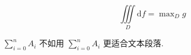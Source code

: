 \documentclass[nofonts]{ctexbook}
\begin{document}
\[
	\iiint\limits_D \mathrm{d} f = \max\nolimits_D g
\]

$\sum\limits_{i = 0}^n A_i$ 不如用 $\sum_{i = 0}^n A_i$ 更适合文本段落.
\end{document}

